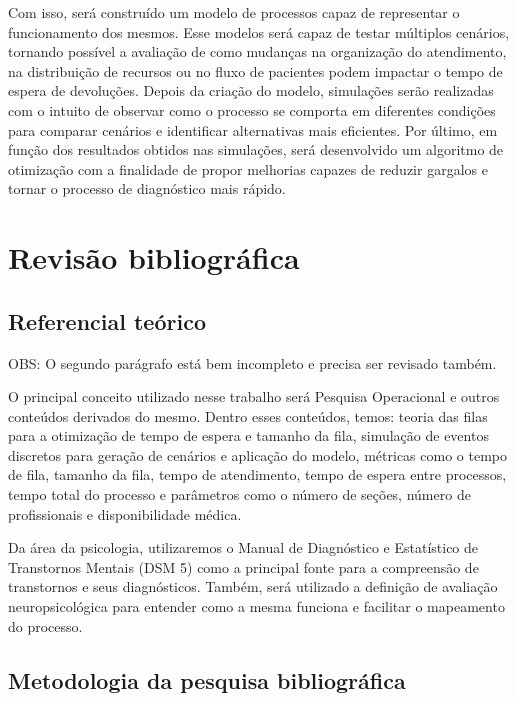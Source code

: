 \documentclass[
    12pt,                %
    openright,           %
    oneside,             %
    a4paper,             %
    english,             %
    brazil               %
]{abntex2}
\begin{document}
Com isso, será construído um modelo de processos capaz de representar o funcionamento dos mesmos. Esse modelos será capaz de testar múltiplos cenários, tornando possível a avaliação de como mudanças na organização do atendimento, na distribuição de recursos ou no fluxo de pacientes podem impactar o tempo de espera de devoluções. Depois da criação do modelo, simulações serão realizadas com o intuito de observar como o processo se comporta em diferentes condições para comparar cenários e identificar alternativas mais eficientes. Por último, em função dos resultados obtidos nas simulações, será desenvolvido um algoritmo de otimização com a finalidade de propor melhorias capazes de reduzir gargalos e tornar o processo de diagnóstico mais rápido.
 

\chapter{Revisão bibliográfica}

\section{Referencial teórico}
\label{sec:referencial}
OBS: O segundo parágrafo está bem incompleto e precisa ser revisado também. 

O principal conceito utilizado nesse trabalho será Pesquisa Operacional e outros conteúdos derivados do mesmo. Dentro esses conteúdos, temos:  teoria das filas para a otimização de tempo de espera e tamanho da fila, simulação de eventos discretos para geração de cenários e aplicação do modelo, métricas como o tempo de fila, tamanho da fila, tempo de atendimento, tempo de espera entre processos, tempo total do processo e parâmetros como o número de seções, número de profissionais e disponibilidade médica.

Da área da psicologia, utilizaremos o Manual de Diagnóstico e Estatístico de Transtornos Mentais (DSM 5) como a principal fonte para a compreensão de transtornos e seus diagnósticos. Também, será utilizado a definição de avaliação neuropsicológica para entender como a mesma funciona e facilitar o mapeamento do processo.


\section{Metodologia da pesquisa bibliográfica}
\end{document}
